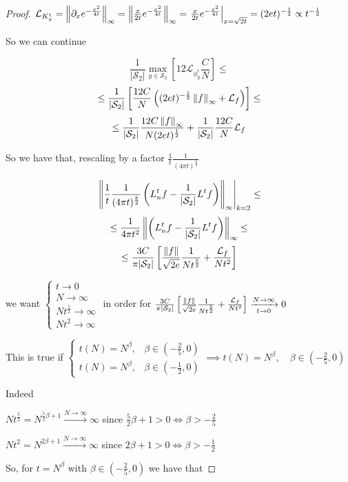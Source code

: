 \begin{proof}
	$\mathcal L_{K^t_y} = \left\lVert\partial_x e^{-\frac{x^2}{4t}}\right\rVert_\infty = \left\lVert\frac{x}{2t}e^{-\frac{x^2}{4t}}\right\rVert_\infty = \left. \frac{x}{2t}e^{-\frac{x^2}{4t}}\right|_{x=\sqrt{2t}}=(2et)^{-\frac{1}{2}}\propto t ^ {-\frac{1}{2}}$
	
	So we can continue
	
	$$ \frac{1}{|\mathcal S_2|} \max _{y\in \mathcal S_2} \left[ 12 \mathcal L_{\phi^t_y} \frac{C}{N} \right]\leq$$
	$$ \leq \frac{1}{|\mathcal S_2|} \left[   \frac{12C}{N} \left( (2et)^{-\frac{1}{2}} \left\lVert f\right\rVert_\infty + \mathcal L_f \right)\right]\leq$$
	$$  \leq \frac{1}{|\mathcal S_2|} \frac{12C\left\lVert f\right\rVert_\infty}{N(2et)^\frac{1}{2}} +   \frac{1}{|\mathcal S_2|} \frac{12C}{N}\mathcal L_f$$
	
	So we have that, rescaling by a factor $\frac{1}{t}\frac{1}{(4\pi t)^{\frac{k}{2}}}$
	
	$$\left.\left\lVert\frac{1}{t}\frac{1}{(4\pi t)^{\frac{k}{2}}}\left(L_n^tf-\frac{1}{|\mathcal S_2|}L^tf\right)\right\rVert_\infty\right|_{k=2}\leq$$
	$$\leq \frac{1}{4\pi t^2}\left\lVert\left(L_n^tf-\frac{1}{|\mathcal S_2|}L^tf\right)\right\rVert_\infty \leq$$
	$$ \leq \frac{3C}{\pi |\mathcal S_2|}\left[\frac{\left\lVert f\right\rVert}{\sqrt{2e}}\frac{1}{Nt^\frac{5}{2}} + \frac{\mathcal L_f}{Nt^2}\right]$$
	
	we want $\begin{cases}
	t \rightarrow 0\\
	N \rightarrow \infty\\
	Nt^\frac{5}{2} \rightarrow \infty\\
	Nt^2 \rightarrow \infty
	\end{cases}$ in order for $ \frac{3C}{\pi |\mathcal S_2|}\left[\frac{\left\lVert f\right\rVert}{\sqrt{2e}}\frac{1}{Nt^\frac{5}{2}} + \frac{\mathcal L_f}{Nt^2}\right] \xrightarrow[t\to 0 ]{N\to\infty}0$
	
	This is true if $\begin{cases}
	t(N) = N^\beta, &\beta\in(-\frac{2}{5}, 0) \\
	t(N) = N^\beta, &\beta\in(-\frac{1}{2}, 0)
	\end{cases} \implies t(N) = N^\beta, \quad \beta\in(-\frac{2}{5}, 0)$
	
	Indeed 
	
	$Nt^\frac{5}{2}=N^{\frac{5}{2}\beta+1}\xrightarrow{N \to \infty} \infty$ since $\frac{5}{2}\beta+1>0 \iff \beta>-\frac{2}{5}$
	
	$Nt^2=N^{2\beta+1}\xrightarrow {N \to \infty} \infty$ since $2\beta+1>0 \iff \beta>-\frac{1}{2}$
	
	So, for $t=N^\beta$ with $\beta\in(-\frac{2}{5}, 0)$ we have that 
	

\end{proof}
